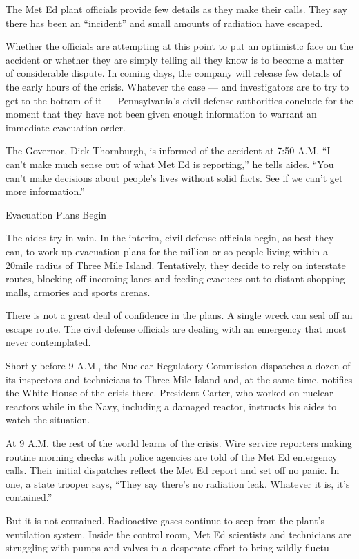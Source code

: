 The Met Ed plant officials provide few details as they make their calls.
They say there has been an ``incident'' and small amounts of radiation
have escaped.

Whether the officials are attempting at this point to put an optimistic
face on the accident or whether they are simply telling all they know is
to become a matter of considerable dispute. In coming days, the company
will release few details of the early hours of the crisis. Whatever the
case --- and investigators are to try to get to the bottom of it ---
Pennsylvania's civil defense authorities conclude for the moment that
they have not been given enough information to warrant an immediate
evacuation order.

The Governor, Dick Thornburgh, is informed of the accident at 7:50 A.M.
``I can't make much sense out of what Met Ed is reporting,'' he tells
aides. ``You can't make decisions about people's lives without solid
facts. See if we can't get more information.''

Evacuation Plans Begin

The aides try in vain. In the interim, civil defense officials begin, as
best they can, to work up evacuation plans for the million or so people
living within a 20mile radius of Three Mile Island. Tentatively, they
decide to rely on interstate routes, blocking off incoming lanes and
feeding evacuees out to distant shopping malls, armories and sports
arenas.

There is not a great deal of confidence in the plans. A single wreck can
seal off an escape route. The civil defense officials are dealing with
an emergency that most never contemplated.

Shortly before 9 A.M., the Nuclear Regulatory Commission dispatches a
dozen of its inspectors and technicians to Three Mile Island and, at the
same time, notifies the White House of the crisis there. President
Carter, who worked on nuclear reactors while in the Navy, including a
damaged reactor, instructs his aides to watch the situation.

At 9 A.M. the rest of the world learns of the crisis. Wire service
reporters making routine morning checks with police agencies are told of
the Met Ed emergency calls. Their initial dispatches reflect the Met Ed
report and set off no panic. In one, a state trooper says, ``They say
there's no radiation leak. Whatever it is, it's contained.''

But it is not contained. Radioactive gases continue to seep from the
plant's ventilation system. Inside the control room, Met Ed scientists
and technicians are struggling with pumps and valves in a desperate
effort to bring wildly fluctu-

